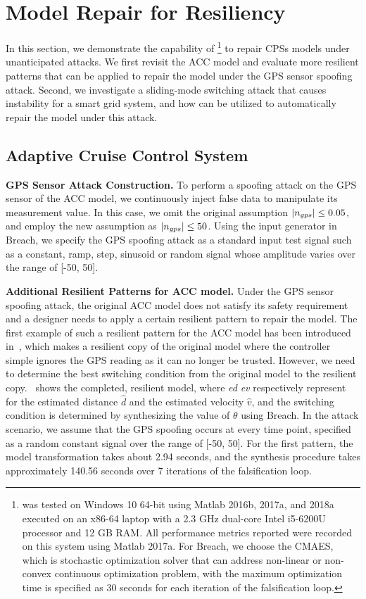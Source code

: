 \section{Model Repair for Resiliency}
%
%
In this section, we demonstrate the capability of \toolreaffirm\footnote{\toolreaffirm was tested on Windows 10 64-bit using Matlab 2016b, 2017a, and 2018a executed on an x86-64 laptop with a 2.3 GHz dual-core Intel i5-6200U processor and 12 GB RAM. All performance metrics reported were recorded on this system using Matlab 2017a. For Breach, we choose the CMAES, which is stochastic optimization solver that can address non-linear or non-convex continuous optimization problem, with the maximum optimization time is specified as 30 seconds for each iteration of the falsification loop.} to repair CPSs models under unanticipated attacks. We first revisit the ACC model and evaluate more resilient patterns that can be applied to repair the model under the GPS sensor spoofing attack. Second, we investigate a sliding-mode switching attack that causes instability for a smart grid system, and how \toolreaffirm can be utilized to automatically repair the model under this attack.

\subsection{Adaptive Cruise Control System}
{\bf GPS Sensor Attack Construction.} To perform a spoofing attack on the GPS sensor of the ACC model, we continuously inject false data to manipulate its measurement value. In this case, we omit the original assumption $|n_{gps}| \leq 0.05$, and employ the new assumption as $|n_{gps}| \leq 50$. Using the input generator in Breach, we specify the GPS spoofing attack as a standard input test signal such as a constant, ramp, step, sinusoid or random signal whose amplitude varies over the range of [-50, 50]. 


\vspace{0.5em}
\noindent
{\bf Additional Resilient Patterns for ACC model.} Under the GPS sensor spoofing  attack, the original ACC model does not satisfy its safety requirement and a designer needs to apply a certain resilient pattern to repair the model. The first example of such a resilient pattern for the ACC model has been introduced in~, which makes a resilient copy of the original model where the controller simple ignores the GPS reading as it can no longer be trusted. However, we need to determine the best switching condition from the original model to the resilient copy.~ shows the completed, resilient model, where \emph{ed} \emph{ev} respectively represent for the estimated distance $\hat{d}$ and the estimated velocity $\hat{v}$, and the switching condition is determined by synthesizing the value of $\theta$ using Breach. In the attack scenario, we assume that the GPS spoofing occurs at every time point, specified as a random constant signal over the range of [-50, 50]. For the first pattern, the model transformation takes about 2.94 seconds, and the synthesis procedure takes approximately 140.56 seconds over 7 iterations of the falsification loop.  

